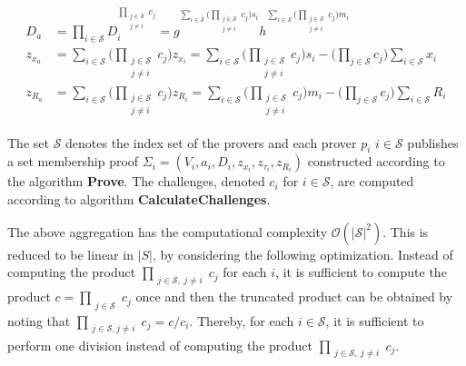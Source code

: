 \begin{equation}
\begin{aligned}
\label{eq:aggDn}
D_a &=\prod_{i\in\mathcal{S}}  D_i ^{\prod_{\substack{j\in\mathcal{S}\\ j\neq i}} c_j }  =  g ^ {\sum_{i\in\mathcal{S}} \Big(\prod_{\substack{j\in\mathcal{S}\\ j\neq i}}   c_j \Big)s_i} h^ {\sum_{i\in\mathcal{S}} \Big(\prod_{\substack{j\in\mathcal{S}\\ j\neq i}}   c_j \Big)m_i}
 \\
z_{x_a} &= \sum_{i\in\mathcal{S}} \Big( \prod_{\substack{j\in\mathcal{S}\\ j\neq i}} c_j \Big) z_{x_i} = \sum_{i\in\mathcal{S}} \Big( \prod_{\substack{j\in\mathcal{S}\\ j\neq i}} c_j \Big)s_i - \big( \prod_{j\in\mathcal{S}} c_j \big) \sum_{i\in\mathcal{S}} x_i
\\
z_{R_a} &=  \sum_{i\in\mathcal{S}}  \Big( \prod_{\substack{j\in\mathcal{S}\\ j\neq i}} c_j \Big) z_{R_i} = \sum_{i\in\mathcal{S}} \Big( \prod_{\substack{j\in\mathcal{S}\\ j\neq i}} c_j \Big)m_i - \big( \prod_{j\in\mathcal{S}} c_j \big) \sum_{i\in\mathcal{S}} R_i 
\end{aligned}
\end{equation}

The set $\mathcal{S}$ denotes the index set of the provers and each prover $p_i$ $i\in\mathcal{S}$ publishes a set membership proof $\Sigma_i = (V_i,a_i,D_i,z_{x_i},z_{\tau_i},z_{R_i})$ constructed according to the algorithm \textbf{Prove}. %
The challenges, denoted $c_i$ for $i\in\mathcal{S}$, are computed according to algorithm \textbf{CalculateChallenges}.

The above aggregation has the computational complexity $\mathcal{O}(|\mathcal{S}|^2)$. This is reduced to be linear in $|S|$, by considering the following optimization. Instead of computing the product $\prod_{\substack{j\in\mathcal{S},\: j\neq i}} c_j $ for each $i$, it is sufficient to compute the product $c=\prod_{\substack{j\in\mathcal{S}}} c_j $  once and then the truncated product can be obtained by noting that $ \prod_{\substack{j\in\mathcal{S},j\neq i}} c_j = c/c_i $. Thereby, for each $i\in\mathcal{S}$, it is sufficient to perform one division instead of computing the product $\prod_{\substack{j\in\mathcal{S},\:j\neq i}} c_j $.

